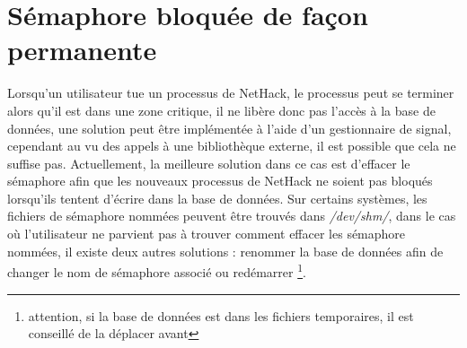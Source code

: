 \documentclass[10pt,a4paper]{report}
\begin{document}
\section{Sémaphore bloquée de façon permanente}
Lorsqu'un utilisateur tue un processus de NetHack, le processus peut se terminer
alors qu'il est dans une zone critique, il ne libère donc pas l'accès à la base
de données, une solution peut être implémentée à l'aide d'un gestionnaire de
signal, cependant au vu des appels à une bibliothèque externe, il est possible
que cela ne suffise pas. Actuellement, la meilleure solution dans ce cas est
d'effacer le sémaphore afin que les nouveaux processus de NetHack ne soient pas
bloqués lorsqu'ils tentent d'écrire dans la base de données. Sur certains
systèmes, les fichiers de sémaphore nommées peuvent être trouvés dans 
\emph{/dev/shm/}, dans le cas où l'utilisateur ne parvient pas à trouver
comment effacer les sémaphore nommées, il existe deux autres solutions :
renommer la base de données afin de changer le nom de sémaphore associé ou
redémarrer \footnote{attention, si la base de données est dans les fichiers
temporaires, il est 
conseillé de la déplacer avant}.
\end{document}
